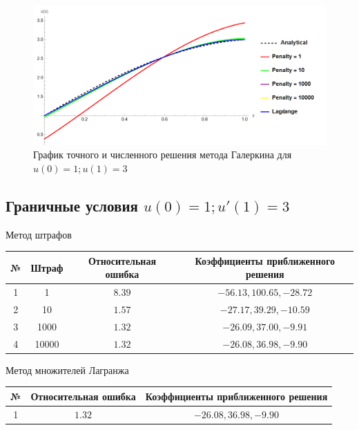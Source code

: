 \documentclass[12pt,a4paper]{article}
\begin{document}
\begin{figure}[h]
	\centering
	\includegraphics[width=1\textwidth]{m-2-1.PNG}
	\caption{График точного и численного решения метода Галеркина для $u(0) = 1; u(1) = 3$}
\end{figure}

\subsection{Граничные условия $u(0) = 1; u'(1) = 3$}

\begin{center}
	Метод штрафов
	\begin{tabular}{|c|c|c|c|} 
		\hline
		№ & Штраф & Относительная ошибка & Коэффициенты приближенного решения \\ 
		\hline
		1 & 1 &$8.39$ & ${-56.13,100.65,-28.72}$ \\ 
		\hline
		2 & 10 &$1.57$ & ${-27.17,39.29,-10.59}$ \\ 
		\hline
		3 & 1000 &$1.32$ & ${-26.09,37.00,-9.91}$ \\ 
		\hline
		4 & 10000 &$1.32$ & ${-26.08,36.98,-9.90}$ \\ 
		\hline
	\end{tabular}
\end{center}

\begin{center}
	Метод множителей Лагранжа
	\begin{tabular}{|c|c|c|} 
		\hline
		№ & Относительная ошибка & Коэффициенты приближенного решения \\ 
		\hline
		1 & $1.32$ & ${-26.08,36.98,-9.90}$ \\ 
		\hline
	\end{tabular}
\end{center}
\end{document}
